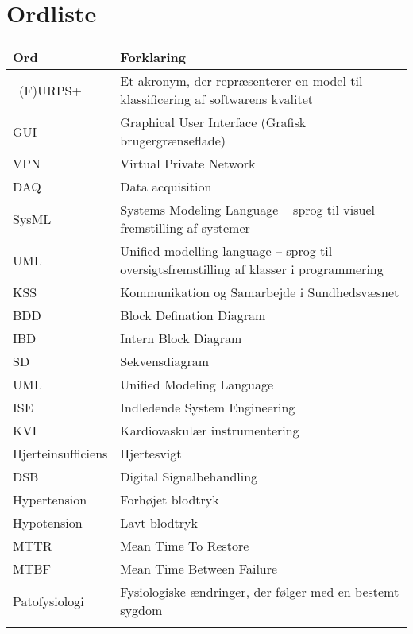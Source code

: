 \chapter{Ordliste}

\begin{longtabu} to 
    Ord &    Forklaring\\
    \toprule\
(F)URPS+ 	&    Et akronym, der repræsenterer en model til klassificering af softwarens kvalitet \\
    GUI		&	Graphical User Interface (Grafisk brugergrænseflade)\\
    VPN		&	Virtual Private Network\\
    DAQ		&	Data acquisition \\
    SysML	&   Systems Modeling Language – sprog til visuel fremstilling af systemer \\
    UML		& Unified modelling language – sprog til oversigtsfremstilling af klasser i programmering \\
    KSS		&	Kommunikation og Samarbejde i Sundhedsvæsnet \\
    BDD 	&	Block Defination Diagram \\
	IBD		& 	Intern Block Diagram \\
	SD		& 	Sekvensdiagram \\
	UML		& 	Unified Modeling Language \\
	ISE 	&	Indledende System Engineering \\
	KVI		&	Kardiovaskulær instrumentering \\
	Hjerteinsufficiens &  Hjertesvigt \\
	DSB		&	Digital Signalbehandling \\
	Hypertension &  Forhøjet blodtryk \\
	Hypotension & Lavt blodtryk \\
	MTTR	&	Mean Time To Restore \\
	MTBF	&	Mean Time Between Failure \\
	Patofysiologi & Fysiologiske ændringer, der følger med en bestemt sygdom \\
 
\label{forkort}
\end{longtabu}